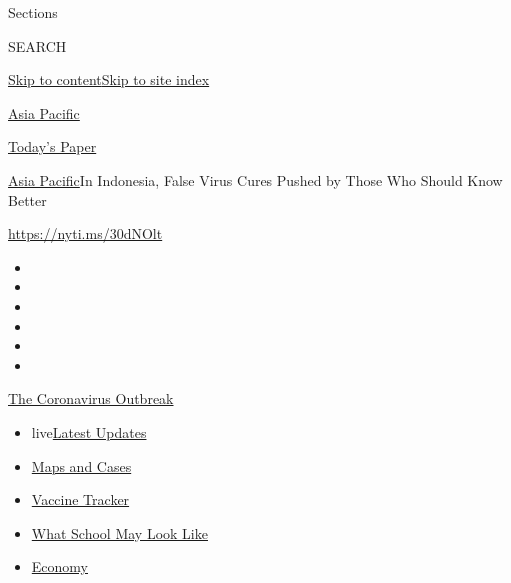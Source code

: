 Sections

SEARCH

\protect\hyperlink{site-content}{Skip to
content}\protect\hyperlink{site-index}{Skip to site index}

\href{https://www.nytimes.com/section/world/asia}{Asia Pacific}

\href{https://myaccount.nytimes.com/auth/login?response_type=cookie\&client_id=vi}{}

\href{https://www.nytimes.com/section/todayspaper}{Today's Paper}

\href{/section/world/asia}{Asia Pacific}\textbar{}In Indonesia, False
Virus Cures Pushed by Those Who Should Know Better

\url{https://nyti.ms/30dNOlt}

\begin{itemize}
\item
\item
\item
\item
\item
\item
\end{itemize}

\href{https://www.nytimes.com/news-event/coronavirus?action=click\&pgtype=Article\&state=default\&region=TOP_BANNER\&context=storylines_menu}{The
Coronavirus Outbreak}

\begin{itemize}
\tightlist
\item
  live\href{https://www.nytimes.com/2020/08/01/world/coronavirus-covid-19.html?action=click\&pgtype=Article\&state=default\&region=TOP_BANNER\&context=storylines_menu}{Latest
  Updates}
\item
  \href{https://www.nytimes.com/interactive/2020/us/coronavirus-us-cases.html?action=click\&pgtype=Article\&state=default\&region=TOP_BANNER\&context=storylines_menu}{Maps
  and Cases}
\item
  \href{https://www.nytimes.com/interactive/2020/science/coronavirus-vaccine-tracker.html?action=click\&pgtype=Article\&state=default\&region=TOP_BANNER\&context=storylines_menu}{Vaccine
  Tracker}
\item
  \href{https://www.nytimes.com/interactive/2020/07/29/us/schools-reopening-coronavirus.html?action=click\&pgtype=Article\&state=default\&region=TOP_BANNER\&context=storylines_menu}{What
  School May Look Like}
\item
  \href{https://www.nytimes.com/live/2020/07/31/business/stock-market-today-coronavirus?action=click\&pgtype=Article\&state=default\&region=TOP_BANNER\&context=storylines_menu}{Economy}
\end{itemize}

